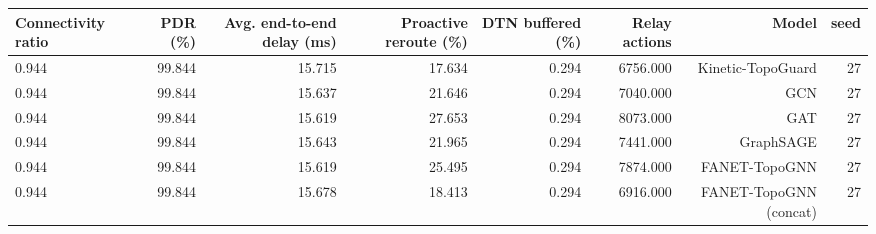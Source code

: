 \begin{tabular}{lrrrrrrr}
\toprule
Connectivity ratio & PDR (\%) & Avg. end-to-end delay (ms) & Proactive reroute (\%) & DTN buffered (\%) & Relay actions & Model & seed \\
\midrule
0.944 & 99.844 & 15.715 & 17.634 & 0.294 & 6756.000 & Kinetic-TopoGuard & 27 \\
0.944 & 99.844 & 15.637 & 21.646 & 0.294 & 7040.000 & GCN & 27 \\
0.944 & 99.844 & 15.619 & 27.653 & 0.294 & 8073.000 & GAT & 27 \\
0.944 & 99.844 & 15.643 & 21.965 & 0.294 & 7441.000 & GraphSAGE & 27 \\
0.944 & 99.844 & 15.619 & 25.495 & 0.294 & 7874.000 & FANET-TopoGNN & 27 \\
0.944 & 99.844 & 15.678 & 18.413 & 0.294 & 6916.000 & FANET-TopoGNN (concat) & 27 \\
\bottomrule
\end{tabular}